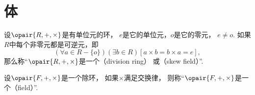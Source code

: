 \section{体}
\begin{definition}
设\(\opair{R,+,\times}\)是有单位元的环，
\(e\)是它的单位元，\(o\)是它的零元，
\(e \neq o\).
如果\(R\)中每个非零元都是可逆元，即\[
	(\forall a \in R-\{o\})(\exists b \in R)[a \times b = b \times a = e],
\]
那么称“\(\opair{R,+,\times}\)是一个（division ring）
或（skew field）”.
\end{definition}

\begin{definition}
设\(\opair{F,+,\times}\)是一个除环，
如果\(\times\)满足交换律，
则称“\(\opair{F,+,\times}\)是一个（field）”.
\end{definition}
